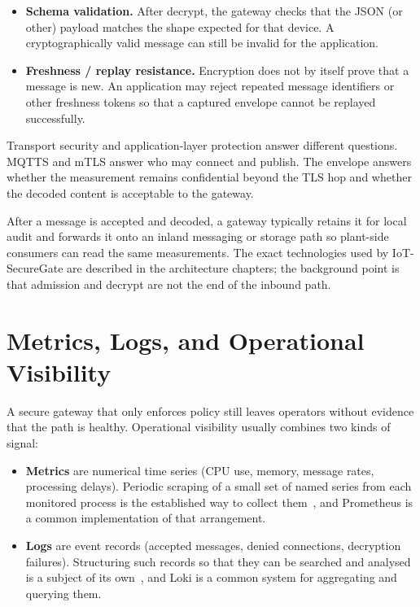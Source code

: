 \documentclass[12pt,a4paper]{report}
\begin{document}
\begin{itemize}
    \item \textbf{Schema validation.}
    After decrypt, the gateway checks that the JSON (or
    other) payload matches the shape expected for that
    device. A cryptographically valid message can still
    be invalid for the application.
    \item \textbf{Freshness / replay resistance.}
    Encryption does not by itself prove that a message
    is new. An application may reject repeated message
    identifiers or other freshness tokens so that a
    captured envelope cannot be replayed successfully.
\end{itemize}

Transport security and application-layer protection
answer different questions. MQTTS and mTLS answer who
may connect and publish. The envelope answers whether
the measurement remains confidential beyond the TLS
hop and whether the decoded content is acceptable to
the gateway.

After a message is accepted and decoded, a gateway
typically retains it for local audit and forwards it
onto an inland messaging or storage path so plant-side
consumers can read the same measurements. The exact
technologies used by IoT-SecureGate are described in
the architecture chapters; the background point is that
admission and decrypt are not the end of the inbound
path.

\section{Metrics, Logs, and Operational Visibility}

A secure gateway that only enforces policy still leaves
operators without evidence that the path is healthy.
Operational visibility usually combines two kinds of
signal:

\begin{itemize}
    \item \textbf{Metrics} are numerical time series
    (CPU use, memory, message rates, processing delays).
    Periodic scraping of a small set of named series from
    each monitored process is the established way to
    collect them~\cite{sre}, and Prometheus is a common
    implementation of that arrangement.
    \item \textbf{Logs} are event records (accepted
    messages, denied connections, decryption failures).
    Structuring such records so that they can be searched
    and analysed is a subject of its
    own~\cite{loganalysis}, and Loki is a common system
    for aggregating and querying them.
\end{itemize}
\end{document}
